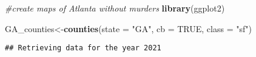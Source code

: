 \documentclass[
]{article}
\newenvironment{Shaded}{\begin{snugshade}}{\end{snugshade}}
\newcommand{\AttributeTok}[1]{\textcolor[rgb]{0.13,0.29,0.53}{#1}}
\newcommand{\CommentTok}[1]{\textcolor[rgb]{0.56,0.35,0.01}{\textit{#1}}}
\newcommand{\ConstantTok}[1]{\textcolor[rgb]{0.56,0.35,0.01}{#1}}
\newcommand{\FunctionTok}[1]{\textcolor[rgb]{0.13,0.29,0.53}{\textbf{#1}}}
\newcommand{\NormalTok}[1]{#1}
\newcommand{\OtherTok}[1]{\textcolor[rgb]{0.56,0.35,0.01}{#1}}
\newcommand{\StringTok}[1]{\textcolor[rgb]{0.31,0.60,0.02}{#1}}
\begin{document}
\begin{Shaded}
\begin{Highlighting}[]
\CommentTok{\#create maps of Atlanta without murders}
\FunctionTok{library}\NormalTok{(ggplot2)}

\NormalTok{GA\_counties}\OtherTok{\textless{}{-}}\FunctionTok{counties}\NormalTok{(}\AttributeTok{state =} \StringTok{"GA"}\NormalTok{, }\AttributeTok{cb =} \ConstantTok{TRUE}\NormalTok{, }\AttributeTok{class =} \StringTok{"sf"}\NormalTok{)}
\end{Highlighting}
\end{Shaded}

\begin{verbatim}
## Retrieving data for the year 2021
\end{verbatim}

\begin{verbatim}

\end{verbatim}
\end{document}
